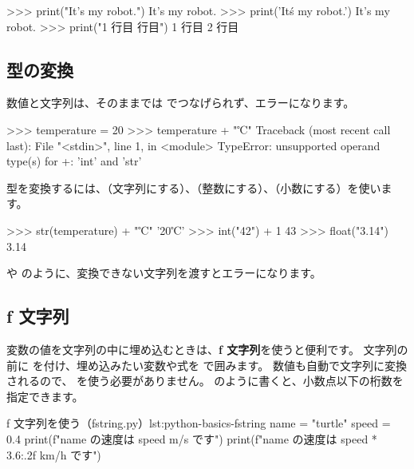 \begin{terminal}[エスケープシーケンス]
>>> print("It's my robot.")
It's my robot.
>>> print('It\'s my robot.')
It's my robot.
>>> print("1 行目 行目")
1 行目
2 行目
\end{terminal}

\subsection{型の変換}

数値と文字列は、そのままでは \cmd{+} でつなげられず、エラーになります。

\begin{terminal}[数値と文字列はつなげられない]
>>> temperature = 20
>>> temperature + "℃"
Traceback (most recent call last):
  File "<stdin>", line 1, in <module>
TypeError: unsupported operand type(s) for +: 'int' and 'str'
\end{terminal}

型を変換するには、（文字列にする）、（整数にする）、（小数にする）を使います。

\begin{terminal}[型を変換する]
>>> str(temperature) + "℃"
'20℃'
>>> int("42") + 1
43
>>> float("3.14")
3.14
\end{terminal}

 や  のように、変換できない文字列を渡すとエラーになります。

\subsection{f 文字列}

変数の値を文字列の中に埋め込むときは、\textbf{f 文字列}を使うと便利です。
文字列の前に  を付け、埋め込みたい変数や式を \cmd{\{ \}} で囲みます。
数値も自動で文字列に変換されるので、 を使う必要がありません。
 のように書くと、小数点以下の桁数を指定できます。

\begin{codelisting}[style=python]{f 文字列を使う（fstring.py）}{lst:python-basics-fstring}
name = "turtle"
speed = 0.4
print(f"{name} の速度は {speed} m/s です")
print(f"{name} の速度は {speed * 3.6:.2f} km/h です")
\end{codelisting}


